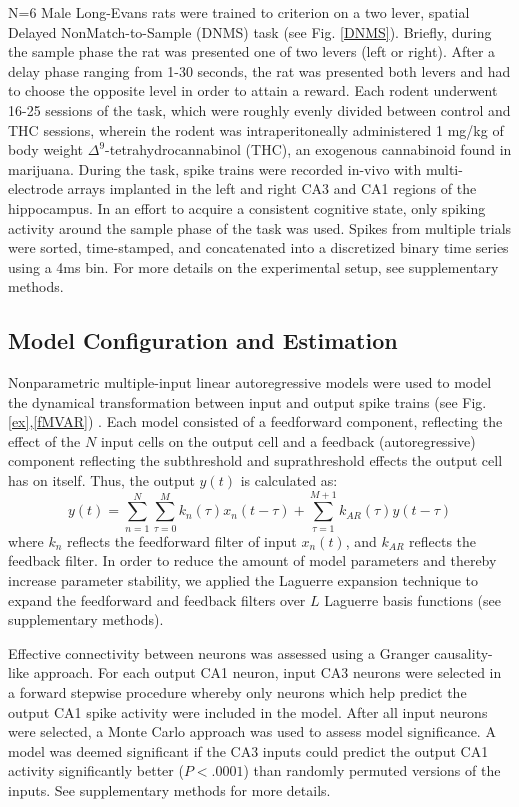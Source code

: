 \documentclass[11pt,a4paper,final]{article}
\begin{document}
N=6 Male Long-Evans rats were trained to criterion on a two lever, spatial Delayed NonMatch-to-Sample (DNMS) task (see Fig. \ref{DNMS}).
Briefly, during the sample phase the rat was presented one of two levers (left or right).
After a delay phase ranging from 1-30 seconds, the rat was presented both levers and had to choose the opposite level in order to attain a reward.
Each rodent underwent 16-25 sessions of the task, which were roughly evenly divided between control and THC sessions, wherein the rodent was intraperitoneally administered 1 mg/kg of body weight $\Delta^9$-tetrahydrocannabinol (THC), an exogenous cannabinoid found in marijuana.
During the task, spike trains were recorded in-vivo with multi-electrode arrays implanted in the left and right CA3 and CA1 regions of the hippocampus.
In an effort to acquire a consistent cognitive state, only spiking activity around the sample phase of the task was used.
Spikes from multiple trials were sorted, time-stamped, and concatenated into a discretized binary time series using a 4ms bin.
For more details on the experimental setup, see supplementary methods.

    \subsection{Model Configuration and Estimation}
Nonparametric multiple-input linear autoregressive models were used to model the dynamical transformation between input and output spike trains (see Fig. \ref{ex},\ref{fMVAR}) \citep{sandler14,sandler15}.
Each model consisted of a feedforward component, reflecting the effect of the $N$ input cells on the output cell and a feedback (autoregressive) component reflecting the subthreshold and suprathreshold effects the output cell has on itself. Thus, the output $y(t)$ is calculated as:
\begin{equation}
    y(t)=\sum_{n=1}^{N}\sum_{\tau=0}^{M}k_{n}(\tau)x_{n}(t-\tau)+\sum_{\tau=1}^{M+1}k_{AR}(\tau)y(t-\tau)
\label{eq:MVAR}
\end{equation}
where $k_{n}$ reflects the feedforward filter of input $x_n(t)$, and $k_{AR}$ reflects the feedback filter.
In order to reduce the amount of model parameters and thereby increase parameter stability, we applied the Laguerre expansion technique to expand the feedforward and feedback filters over $L$ Laguerre basis functions (see supplementary methods).

Effective connectivity between neurons was assessed using a Granger causality-like approach.
For each output CA1 neuron, input CA3 neurons were selected in a forward stepwise procedure whereby only neurons which help predict the output CA1 spike activity were included in the model.
After all input neurons were selected, a Monte Carlo approach was used to assess model significance.
A model was deemed significant if the CA3 inputs could predict the output CA1 activity significantly better ($P<.0001$) than randomly permuted versions of the inputs.
See supplementary methods for more details.
\end{document}
